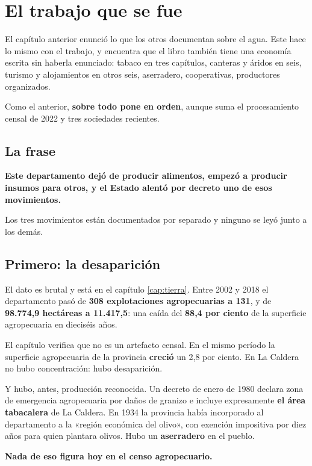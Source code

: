 \chapter{El trabajo que se fue}
\label{cap:trabajo}

El capítulo anterior enunció lo que los otros documentan sobre el agua. Este hace lo mismo con
el trabajo, y encuentra que el libro también tiene una economía escrita sin haberla enunciado:
tabaco en tres capítulos, canteras y áridos en seis, turismo y alojamientos en otros seis,
aserradero, cooperativas, productores organizados.

Como el anterior, \textbf{sobre todo pone en orden}, aunque suma el procesamiento censal de 2022 y tres sociedades recientes.

\section{La frase}

\textbf{Este departamento dejó de producir alimentos, empezó a producir insumos para otros, y
el Estado alentó por decreto uno de esos movimientos.}

Los tres movimientos están documentados por separado y ninguno se leyó junto a los demás.

\section{Primero: la desaparición}

El dato es brutal y está en el capítulo \ref{cap:tierra}. Entre 2002 y 2018 el departamento
pasó de \textbf{308 explotaciones agropecuarias a 131}, y de \textbf{98.774,9 hectáreas a
11.417,5}: una caída del \textbf{88,4 por ciento} de la superficie agropecuaria en dieciséis
años.

El capítulo verifica que no es un artefacto censal. En el mismo período la superficie
agropecuaria de la provincia \textbf{creció} un 2,8 por ciento. En La Caldera no hubo
concentración: hubo desaparición.

Y hubo, antes, producción reconocida. Un decreto de enero de 1980 declara zona de emergencia
agropecuaria por daños de granizo e incluye expresamente \textbf{el área tabacalera} de La
Caldera. En 1934 la provincia había incorporado al departamento a la «región económica del
olivo», con exención impositiva por diez años para quien plantara olivos. Hubo un
\textbf{aserradero} en el pueblo.

\textbf{Nada de eso figura hoy en el censo agropecuario.}

